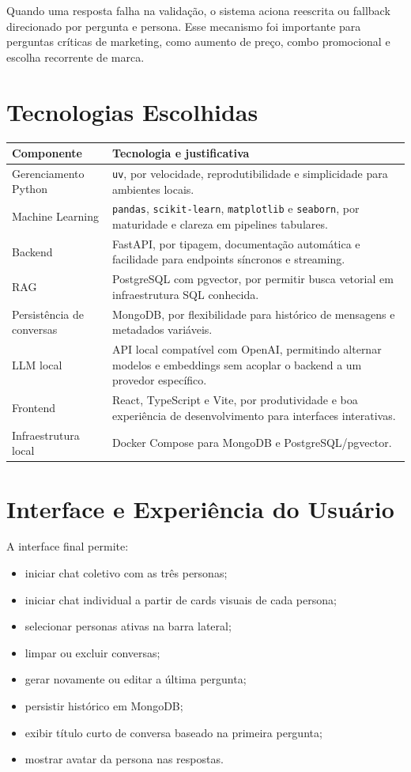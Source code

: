 \documentclass[12pt,a4paper]{article}
\begin{document}
Quando uma resposta falha na validação, o sistema aciona reescrita ou fallback direcionado por pergunta e persona. Esse mecanismo foi importante para perguntas críticas de marketing, como aumento de preço, combo promocional e escolha recorrente de marca.

\section{Tecnologias Escolhidas}

\begin{longtable}{|p{4cm}|p{10cm}|}
\hline
\textbf{Componente} & \textbf{Tecnologia e justificativa} \\
\hline
Gerenciamento Python & \texttt{uv}, por velocidade, reprodutibilidade e simplicidade para ambientes locais. \\
\hline
Machine Learning & \texttt{pandas}, \texttt{scikit-learn}, \texttt{matplotlib} e \texttt{seaborn}, por maturidade e clareza em pipelines tabulares. \\
\hline
Backend & FastAPI, por tipagem, documentação automática e facilidade para endpoints síncronos e streaming. \\
\hline
RAG & PostgreSQL com pgvector, por permitir busca vetorial em infraestrutura SQL conhecida. \\
\hline
Persistência de conversas & MongoDB, por flexibilidade para histórico de mensagens e metadados variáveis. \\
\hline
LLM local & API local compatível com OpenAI, permitindo alternar modelos e embeddings sem acoplar o backend a um provedor específico. \\
\hline
Frontend & React, TypeScript e Vite, por produtividade e boa experiência de desenvolvimento para interfaces interativas. \\
\hline
Infraestrutura local & Docker Compose para MongoDB e PostgreSQL/pgvector. \\
\hline
\end{longtable}

\section{Interface e Experiência do Usuário}

A interface final permite:

\begin{itemize}
  \item iniciar chat coletivo com as três personas;
  \item iniciar chat individual a partir de cards visuais de cada persona;
  \item selecionar personas ativas na barra lateral;
  \item limpar ou excluir conversas;
  \item gerar novamente ou editar a última pergunta;
  \item persistir histórico em MongoDB;
  \item exibir título curto de conversa baseado na primeira pergunta;
  \item mostrar avatar da persona nas respostas.
\end{itemize}
\end{document}

